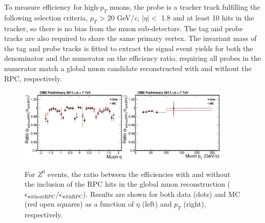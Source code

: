 \documentclass{JINST}
\begin{document}
To measure efficiency for high-$p_T$ muons, the probe is a tracker track fulfilling the following selection criteria,
$p_{T}$ > 20 GeV/\emph{c}, $|\eta| <$ 1.8 and at least 10 hits in the tracker, so there is no bias from the muon sub-detectors.
The tag and probe tracks are also required to share the same primary vertex.
The invariant mass of the tag and probe tracks is fitted to extract the signal event yields for both the denominator and the numerator on the efficiency ratio, requiring all probes in the numerator match a global muon candidate reconstructed with and without %
the RPC, respectively. %

\begin{figure}
  \begin{center}
    \texttt{\includegraphics[width=0.45\textwidth]{effRatio_eta}}\hspace{0.5cm}\texttt{\includegraphics[width=0.45\textwidth]{effRatio_pt}}
    \caption{
    For $Z^{0}$ events, the ratio between the efficiencies with and without the inclusion of the RPC hits in the global muon reconstruction ($\epsilon_{\mathrm{withoutRPC}}/\epsilon_{\mathrm{withRPC}}$).
Results are shown for both data (dots) and MC (red open squares) as a function of $\eta$ (left) and $p_T$ (right), respectively.
    }
    \label{fig:muEffRatio}
    \vspace{-0.3cm}
  \end{center}
\end{figure}
\end{document}
